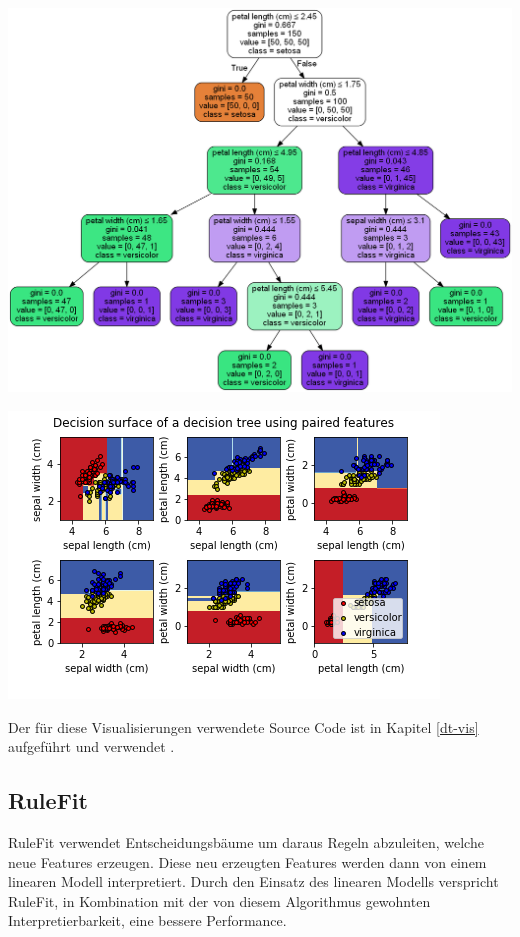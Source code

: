 \documentclass[
  12pt, %
  a4paper, %
  oneside, %
  openany, 
  numbers=noenddot, %
  BCOR=5mm, %
  parskip=half*, %
  thesis, %
]{bfhbook}
\begin{document}
\begin{minipage}[t]{0.45\linewidth}
\centering
	\includegraphics[width=\textwidth]{Bilder/iris-dt-explained.png}
\end{minipage}\hfill
\begin{minipage}[t]{0.45\linewidth}
\centering
	\includegraphics[width=\textwidth]{Bilder/iris-dt-decision-surface.png}
\end{minipage}

Der für diese Visualisierungen verwendete Source Code ist in Kapitel \ref{dt-vis} aufgeführt und verwendet \cite{scikit-learnLink}.


\subsection{RuleFit}
\label{RF}
RuleFit \parencite{Friedman2008} verwendet Entscheidungsbäume um daraus Regeln abzuleiten, welche neue Features erzeugen. Diese neu erzeugten Features werden dann von einem linearen Modell interpretiert. Durch den Einsatz des linearen Modells verspricht RuleFit, in Kombination mit der von diesem Algorithmus gewohnten Interpretierbarkeit, eine bessere Performance.
\end{document}
